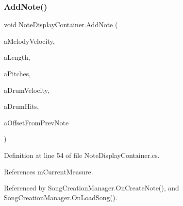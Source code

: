 \subsubsection{\texorpdfstring{Add\+Note()}{AddNote()}}
{\footnotesize\ttfamily void Note\+Display\+Container.\+Add\+Note (\begin{DoxyParamCaption}\item[{int}]{a\+Melody\+Velocity,  }\item[{\hyperlink{group___music_enums_gaf11b5f079adbb21c800b9eca1c5c3cbd}{Music.\+N\+O\+T\+E\+\_\+\+L\+E\+N\+G\+TH}}]{a\+Length,  }\item[{\hyperlink{group___music_enums_ga508f69b199ea518f935486c990edac1d}{Music.\+P\+I\+T\+CH} \mbox{[}$\,$\mbox{]}}]{a\+Pitches,  }\item[{int}]{a\+Drum\+Velocity,  }\item[{\hyperlink{group___music_enums_gade475b4382c7066d1af13e7c13c029b6}{Music.\+D\+R\+UM} \mbox{[}$\,$\mbox{]}}]{a\+Drum\+Hits,  }\item[{\hyperlink{group___music_enums_gaf11b5f079adbb21c800b9eca1c5c3cbd}{Music.\+N\+O\+T\+E\+\_\+\+L\+E\+N\+G\+TH}}]{a\+Offset\+From\+Prev\+Note }\end{DoxyParamCaption})}



Definition at line 54 of file Note\+Display\+Container.\+cs.



References m\+Current\+Measure.



Referenced by Song\+Creation\+Manager.\+On\+Create\+Note(), and Song\+Creation\+Manager.\+On\+Load\+Song().


